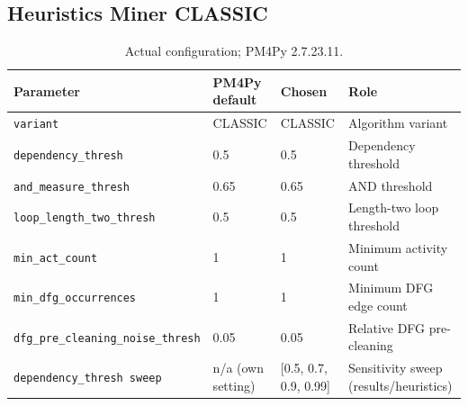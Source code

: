 \subsection{Heuristics Miner CLASSIC}
\begin{table}[h!]
\centering
\small
\begin{tabular}{p{}p{}p{}p{}}
\hline
Parameter & PM4Py default & Chosen & Role \\
\hline
\texttt{variant} & CLASSIC & CLASSIC & Algorithm variant \\
\texttt{dependency\_\allowbreak{}thresh} & 0.5 & 0.5 & Dependency threshold \\
\texttt{and\_\allowbreak{}measure\_\allowbreak{}thresh} & 0.65 & 0.65 & AND threshold \\
\texttt{loop\_\allowbreak{}length\_\allowbreak{}two\_\allowbreak{}thresh} & 0.5 & 0.5 & Length-two loop threshold \\
\texttt{min\_\allowbreak{}act\_\allowbreak{}count} & 1 & 1 & Minimum activity count \\
\texttt{min\_\allowbreak{}dfg\_\allowbreak{}occurrences} & 1 & 1 & Minimum DFG edge count \\
\texttt{dfg\_\allowbreak{}pre\_\allowbreak{}cleaning\_\allowbreak{}noise\_\allowbreak{}thresh} & 0.05 & 0.05 & Relative DFG pre-cleaning \\
\texttt{dependency\_\allowbreak{}thresh sweep} & n/a (own setting) & [0.5, 0.7, 0.9, 0.99] & Sensitivity sweep (results/heuristics) \\
\hline
\end{tabular}
\caption{Actual configuration; PM4Py 2.7.23.11.}
\end{table}
\clearpage
